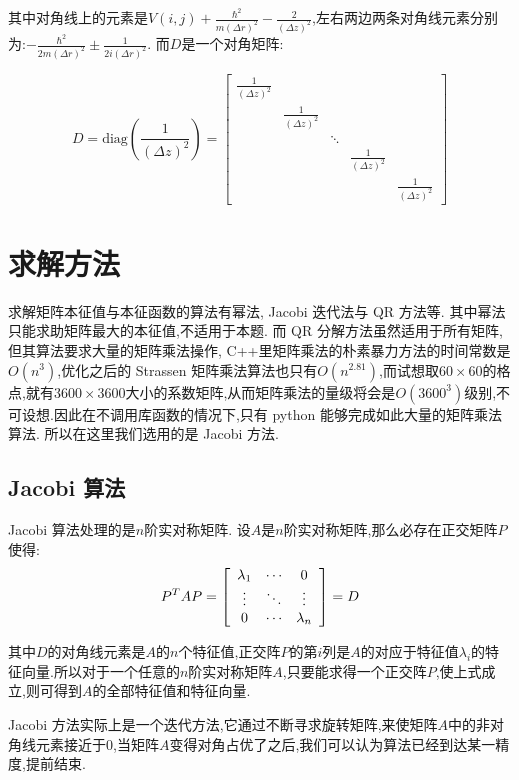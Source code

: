 其中对角线上的元素是$V(i,j)+\frac{\hbar^2}{m(\Delta r)^2}-\frac{2}{(\Delta z)^2}$,左右两边两条对角线元素分别为:$-\frac{\hbar^2}{2m(\Delta r)^2}\pm\frac1{2i(\Delta r)^2}$. 而$D$是一个对角矩阵:

$$
D=\mathrm{diag}\left(\frac1{ (\Delta z)^2}\right)=
\begin{bmatrix}
\frac1{(\Delta z)^2}\\
&\frac1{(\Delta z)^2}\\
&&\ddots\\
&&&\frac1{(\Delta z)^2}\\
&&&&\frac1{(\Delta z)^2}
\end{bmatrix}
$$
 
\section{求解方法}
 
求解矩阵本征值与本征函数的算法有幂法, Jacobi 迭代法与 QR 方法等. 其中幂法只能求助矩阵最大的本征值,不适用于本题. 而 QR 分解方法虽然适用于所有矩阵,但其算法要求大量的矩阵乘法操作, C++里矩阵乘法的朴素暴力方法的时间常数是$O(n^3)$,优化之后的 Strassen 矩阵乘法算法也只有$O(n^{2.81})$,而试想取$60\times 60$的格点,就有$3600\times 3600$大小的系数矩阵,从而矩阵乘法的量级将会是$O(3600^3)$级别,不可设想.因此在不调用库函数的情况下,只有 python 能够完成如此大量的矩阵乘法算法. 所以在这里我们选用的是 Jacobi 方法.

\subsection{Jacobi 算法}
 
 Jacobi 算法处理的是$n$阶实对称矩阵. 设$A$是$n$阶实对称矩阵,那么必存在正交矩阵$P$使得:
 \begin{equation}
 P ^ { T } A P = \left[ \begin{array} { c c c } { \lambda _ { 1 } } & { \cdots } & { 0 } \\ { \vdots } & { \ddots } & { \vdots } \\ { 0 } & { \cdots } & { \lambda _ { n } } \end{array} \right] = D
 \end{equation}
 
 其中$D$的对角线元素是$A$的$n$个特征值,正交阵$P$的第$i$列是$A$的对应于特征值$\lambda_i$的特征向量.所以对于一个任意的$n$阶实对称矩阵$A$,只要能求得一个正交阵$P$,使上式成立,则可得到$A$的全部特征值和特征向量.
 
 Jacobi 方法实际上是一个迭代方法,它通过不断寻求旋转矩阵,来使矩阵$A$中的非对角线元素接近于0,当矩阵$A$变得对角占优了之后,我们可以认为算法已经到达某一精度,提前结束.
 

